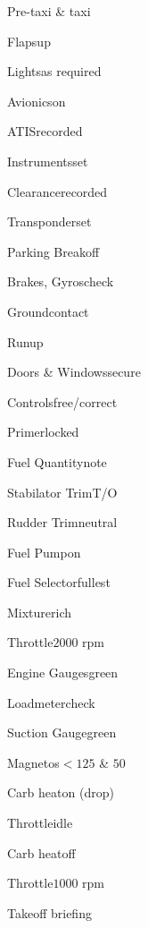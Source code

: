 \begin{multicols}{2}
\begin{checklist}{Pre-taxi \& taxi}
    \item{Flaps}{up}
    \item{Lights}{as required}
    \item{Avionics}{on}
    \item{ATIS}{recorded}
    \item{Instruments}{set}
    \item{Clearance}{recorded}
    \item{Transponder}{set}
    \item{Parking Break}{off}
    \item{Brakes, Gyros}{check}
    \item{Ground}{contact}
\end{checklist}

\begin{checklist}{Runup}
    \item{Doors \& Windows}{secure}
    \item{Controls}{free/correct}
    \item{Primer}{locked}
    \item{Fuel Quantity}{note}
    \item{Stabilator Trim}{T/O}
    \item{Rudder Trim}{neutral}
    \item{Fuel Pump}{on}
    \item{Fuel Selector}{fullest}
    \item{Mixture}{rich}
    \item{Throttle}{$2000$ rpm}
    \item{Engine Gauges}{green}
    \item{Loadmeter}{check}
    \item{Suction Gauge}{green}
    \item{Magnetos}{$<125$ \& $50$}
    \item{Carb heat}{on (drop)}
    \item{Throttle}{idle}
    \item{Carb heat}{off}
    \item{Throttle}{$1000$ rpm}
\end{checklist}

\begin{checklist}{Takeoff briefing}
\end{checklist}


\end{multicols}
